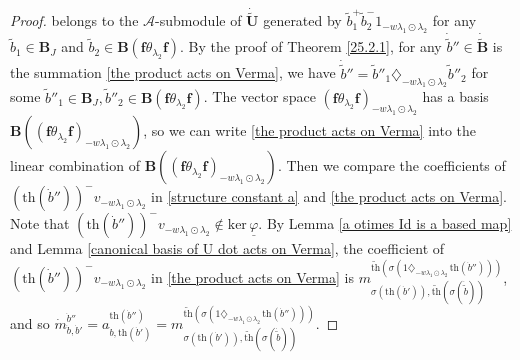 \documentclass[10pt,a4paper]{amsart}
\begin{document}
\begin{proof}
belongs to the $\mathcal{A}$-submodule of $\dot{\tilde{\mathbf{U}}}$ generated by $\tilde{b}_1^+\tilde{b}_2^-1_{-w\lambda_1\odot\lambda_2}$ for any $\tilde{b}_1\in \mathbf{B}_J$ and $\tilde{b}_2\in \mathbf{B}(\mathbf{f}\theta_{\lambda_2}\mathbf{f})$. By the proof of Theorem \ref{25.2.1}, for any $\dot{\tilde{b}}''\in \dot{\tilde{\mathbf{B}}}$ is the summation \eqref{the product acts on Verma}, we have $\dot{\tilde{b}}''=\tilde{b}''_1\diamondsuit_{-w\lambda_1\odot\lambda_2}\tilde{b}''_2$ for some $\tilde{b}''_1\in \mathbf{B}_J,\tilde{b}''_2\in \mathbf{B}(\mathbf{f}\theta_{\lambda_2}\mathbf{f})$. The vector space $(\mathbf{f}\theta_{\lambda_2}\mathbf{f})_{-w\lambda_1\odot\lambda_2}$ has a basis $\mathbf{B}((\mathbf{f}\theta_{\lambda_2}\mathbf{f})_{-w\lambda_1\odot\lambda_2})$, so we can write \eqref{the product acts on Verma} into the linear combination of $\mathbf{B}((\mathbf{f}\theta_{\lambda_2}\mathbf{f})_{-w\lambda_1\odot\lambda_2})$. Then we compare the coefficients of $(\mathrm{th}(\dot{b}''))^-v_{-w\lambda_1\odot\lambda_2}$ in \eqref{structure constant a} and \eqref{the product acts on Verma}. Note that $(\mathrm{th}(\dot{b}''))^-v_{-w\lambda_1\odot\lambda_2}\notin \mathrm{ker}\,\underline{\varphi}$. 
By Lemma \ref{a otimes Id is a based map} and Lemma \ref{canonical basis of U dot acts on Verma}, the coefficient of $(\mathrm{th}(\dot{b}''))^-v_{-w\lambda_1\odot\lambda_2}$ in \eqref{the product acts on Verma} is $m_{\sigma(\mathrm{th}(\dot{b}')),\widetilde{\mathrm{th}}(\sigma(\dot{\tilde{b}}))}^{\widetilde{\mathrm{th}}(\sigma(1\diamondsuit_{-w\lambda_1\odot\lambda_2}\,\mathrm{th}(\dot{b}'')))}$, and so $\dot{m}_{\dot{b},\dot{b}'}^{\dot{b}''}=a_{\dot{b},\mathrm{th}(\dot{b}')}^{\mathrm{th}(\dot{b}'')}=m_{\sigma(\mathrm{th}(\dot{b}')),\widetilde{\mathrm{th}}(\sigma(\dot{\tilde{b}}))}^{\widetilde{\mathrm{th}}(\sigma(1\diamondsuit_{-w\lambda_1\odot\lambda_2}\,\mathrm{th}(\dot{b}'')))}$. 
\end{proof}
\end{document}
